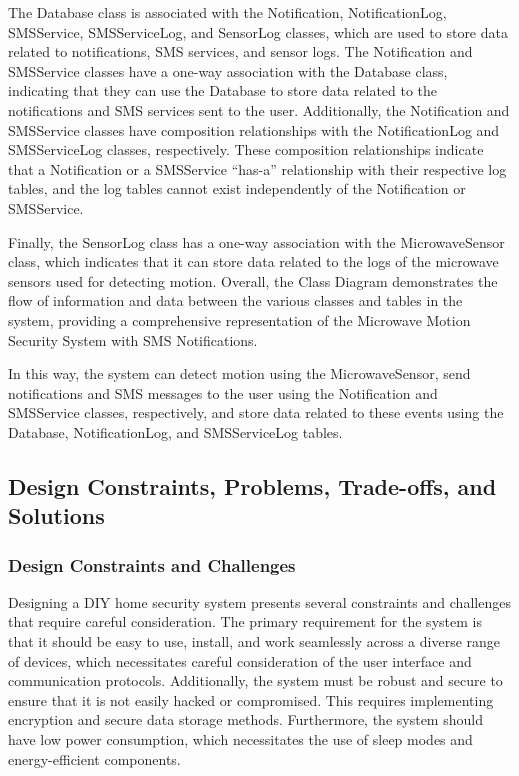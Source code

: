 The Database class is associated with the Notification, NotificationLog, SMSService,
SMSServiceLog, and SensorLog classes, which are used to store data related to
notifications, SMS services, and sensor logs. %
The Notification and SMSService classes have a one-way association with the Database class, indicating that they
can use the Database to store data related to the notifications and SMS services
sent to the user. %
Additionally, the Notification and SMSService classes have composition
relationships with the NotificationLog and SMSServiceLog classes, respectively. %
These composition relationships indicate that a Notification or a SMSService ``has-a''
relationship with their respective log tables, and the log tables cannot exist
independently of the Notification or SMSService. %

Finally, the SensorLog class has a one-way association with the MicrowaveSensor class,
which indicates that it can store data related to the logs of the microwave sensors
used for detecting motion. %
Overall, the Class Diagram demonstrates the flow of information and data between the various classes and tables in the system, providing a
comprehensive representation of the Microwave Motion Security System with
SMS Notifications. %



In this way, the system can detect motion using the MicrowaveSensor, send notifications
and SMS messages to the user using the Notification and SMSService classes, respectively,
and store data related to these events using the Database, NotificationLog, and
SMSServiceLog tables. %

\subsection{Design Constraints, Problems, Trade-offs, and Solutions}\label{subsec:design-constraints-problems-trade-offs-and-solutions}

\subsubsection{Design Constraints and Challenges}

Designing a DIY home security system presents several constraints and challenges that
require careful consideration. %
The primary requirement for the system is that it should be easy to use, install, and work seamlessly across a diverse range of devices, which
necessitates careful consideration of the user interface and communication protocols. %
Additionally, the system must be robust and secure to ensure that it is not easily
hacked or compromised. %
This requires implementing encryption and secure data storage methods. %
Furthermore, the system should have low power consumption, which
necessitates the use of sleep modes and energy-efficient components. %

